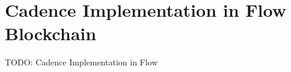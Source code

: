 \documentclass[./main.tex]{subfiles}
\begin{document}
\section{Cadence Implementation in Flow Blockchain}
\label{sec:cadence_implementation}
TODO: Cadence Implementation in Flow
\end{document}
